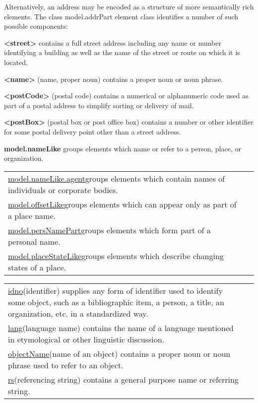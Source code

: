 Alternatively, an address may be encoded as a structure of more semantically rich elements. The class \textsf{model.addrPart} element class identifies a number of such possible components: 
\begin{sansreflist}
  
\item [\textbf{<street>}] contains a full street address including any name or number identifying a building as well as the name of the street or route on which it is located.
\item [\textbf{<name>}] (name, proper noun) contains a proper noun or noun phrase.
\item [\textbf{<postCode>}] (postal code) contains a numerical or alphanumeric code used as part of a postal address to simplify sorting or delivery of mail.
\item [\textbf{<postBox>}] (postal box or post office box) contains a number or other identifier for some postal delivery point other than a street address.
\item [\textbf{model.nameLike}] groups elements which name or refer to a person, place, or organization. \par 
\begin{longtable}{P{0.4008733624454148\textwidth}P{0.44912663755458515\textwidth}}
\hyperref[TEI.model.nameLike.agent]{model.nameLike.agent}\tabcellsep groups elements which contain names of individuals or corporate bodies.\\
\hyperref[TEI.model.offsetLike]{model.offsetLike}\tabcellsep groups elements which can appear only as part of a place name.\\
\hyperref[TEI.model.persNamePart]{model.persNamePart}\tabcellsep groups elements which form part of a personal name.\\
\hyperref[TEI.model.placeStateLike]{model.placeStateLike}\tabcellsep groups elements which describe changing states of a place.\end{longtable} \par
  \par 
\begin{longtable}{P{0.17031539888682745\textwidth}P{0.6796846011131725\textwidth}}
\hyperref[TEI.idno]{idno}\tabcellsep (identifier) supplies any form of identifier used to identify some object, such as a bibliographic item, a person, a title, an organization, etc. in a standardized way.\\
\hyperref[TEI.lang]{lang}\tabcellsep (language name) contains the name of a language mentioned in etymological or other linguistic discussion.\\
\hyperref[TEI.objectName]{objectName}\tabcellsep (name of an object) contains a proper noun or noun phrase used to refer to an object.\\
\hyperref[TEI.rs]{rs}\tabcellsep (referencing string) contains a general purpose name or referring string.\end{longtable} \par
 

\end{sansreflist}
